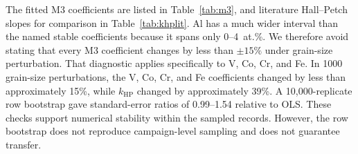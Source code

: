 \documentclass[a4paper,11pt]{article}
\begin{document}
The fitted M3 coefficients are listed in Table~\ref{tab:m3}, and literature Hall--Petch slopes for comparison in Table~\ref{tab:khplit}. Al has a much wider interval than the named stable coefficients because it spans only 0--4~at.\%. We therefore avoid stating that every M3 coefficient changes by less than $\pm15\%$ under grain-size perturbation. That diagnostic applies specifically to V, Co, Cr, and Fe. In 1000 grain-size perturbations, the V, Co, Cr, and Fe coefficients changed by less than approximately 15\%, while $k_{\mathrm{HP}}$ changed by approximately 39\%. A 10,000-replicate row bootstrap gave standard-error ratios of 0.99--1.54 relative to OLS. These checks support numerical stability within the sampled records. However, the row bootstrap does not reproduce campaign-level sampling and does not guarantee transfer.
\end{document}
